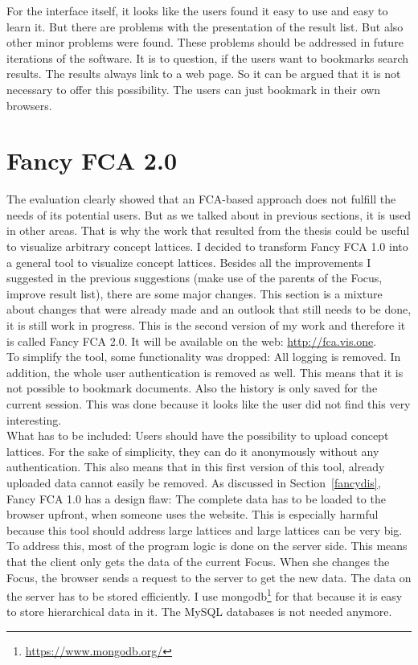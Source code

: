 \documentclass[11pt]{report}
\begin{document}
For the interface itself, it looks like the users found it easy to use and easy to learn it. But there are problems with the presentation of the result list. But also other minor problems were found. These problems should be addressed in future iterations of the software. It is to question, if the users want to bookmarks search results. The results always link to a web page. So it can be argued that it is not necessary to offer this possibility. The users can just bookmark in their own browsers.

\chapter{Fancy FCA 2.0}
\label{Fancy 2.0}

The evaluation clearly showed that an FCA-based approach does not fulfill the needs of its potential users. But as we talked about in previous sections, it is used in other areas. That is why the work that resulted from the thesis could be useful to visualize arbitrary concept lattices. I decided to transform Fancy FCA 1.0 into a general tool to visualize concept lattices. Besides all the improvements I suggested in the previous suggestions (make use of the parents of the Focus, improve result list), there are some major changes. This section is a mixture about changes that were already made and an outlook that still needs to be done, it is still work in progress. This is the second version of my work and therefore it is called Fancy FCA 2.0. It will be available on the web: \url{http://fca.vis.one}.\\

To simplify the tool, some functionality was dropped: All logging is removed. In addition, the whole user authentication is removed as well. This means that it is not possible to bookmark documents. Also the history is only saved for the current \gls{session}. This was done because it looks like the user did not find this very interesting.\\

What has to be included: Users should have the possibility to upload concept lattices. For the sake of simplicity, they can do it anonymously without any authentication. This also means that in this first version of this tool, already uploaded data cannot easily be removed. As discussed in Section~\ref{fancydis}, Fancy FCA 1.0 has a design flaw: The complete data has to be loaded to the browser upfront, when someone uses the website. This is especially harmful because this tool should address large lattices and large lattices can be very big. To address this, most of the program logic is done on the server side. This means that the client only gets the data of the current Focus. When she changes the Focus, the browser sends a request to the server to get the new data. The data on the server has to be stored efficiently. I use mongodb\footnote{\url{https://www.mongodb.org/}} for that because it is easy to store hierarchical data in it. The MySQL databases is not needed anymore. \\
\end{document}
